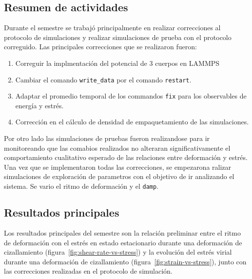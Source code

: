\documentclass[../main.tex]{subfiles}
\begin{document}
\subsection{Resumen de actividades}

Durante el semestre se trabajó principalmente en realizar correcciones al protocolo de simulaciones y realizar simulaciones de prueba con el protocolo correguido.
Las principales correcciones que se realizaron fueron:
\begin{enumerate}
    \item Correguir la implmentación del potencial de 3 cuerpos en LAMMPS
    \item Cambiar el comando \texttt{write\_data} por el comando \texttt{restart}.
    \item Adaptar el promedio temporal de los commandos \texttt{fix} para los observables de energía y estrés.
    \item Corrección en el cálculo de densidad de empaquetamiento de las simulaciones.
\end{enumerate}
Por otro lado las simulaciones de pruebas fueron realizandose para ir monitoreando que las comabios realizados no alteraran significativamente el comportamiento cualitativo esperado de las relaciones entre deformación y estrés.
Una vez que se implementaron todas las correcciones, se empezarona ralizar simulaciones de exploración de parametros con el objetivo de ir analizando el sistema.
Se vario el ritmo de deformación y el \texttt{damp}.



\subsection{Resultados principales}

Los resultados principales del semestre son la relación preliminar entre el ritmo de deformación con el estrés en estado estacionario durante una deformación de cizallamiento (figura~\ref{fig:shear-rate-vs-stress}) y la evolución del estrés virial durante una deformación de cizallamiento (figura~\ref{fig:strain-vs-stress}), junto con las correcciones realizadas en el protocolo de simulación.
\end{document}
